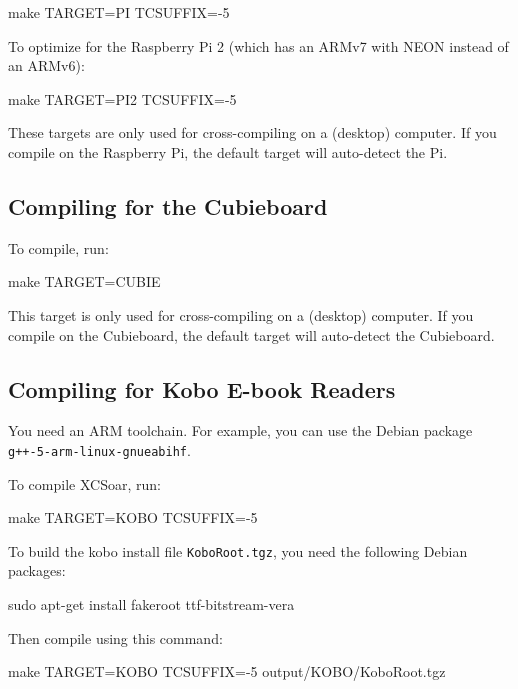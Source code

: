 \begin{verbatim*}
make TARGET=PI TCSUFFIX=-5
\end{verbatim*}

To optimize for the Raspberry Pi 2 (which has an ARMv7 with NEON
instead of an ARMv6):

\begin{verbatim*}
make TARGET=PI2 TCSUFFIX=-5
\end{verbatim*}

These targets are only used for cross-compiling on a (desktop)
computer.
If you compile on the Raspberry Pi, the default target will
auto-detect the Pi.

\subsection{Compiling for the Cubieboard}

To compile, run:

\begin{verbatim*}
make TARGET=CUBIE
\end{verbatim*}

This target is only used for cross-compiling on a (desktop) computer.
If you compile on the Cubieboard, the default target will auto-detect
the Cubieboard.

\subsection{Compiling for Kobo E-book Readers}

You need an ARM toolchain.  For example, you can use the Debian
package \verb|g++-5-arm-linux-gnueabihf|.

To compile XCSoar, run:

\begin{verbatim*}
make TARGET=KOBO TCSUFFIX=-5
\end{verbatim*}

To build the kobo install file \texttt{KoboRoot.tgz}, you need the
following Debian packages:

\begin{verbatim*}
sudo apt-get install fakeroot ttf-bitstream-vera
\end{verbatim*}

Then compile using this command:

\begin{verbatim*}
make TARGET=KOBO TCSUFFIX=-5 output/KOBO/KoboRoot.tgz
\end{verbatim*}

